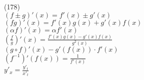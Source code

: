 (178)\\
$(f \pm g)'(x) = f'(x) \pm g'(x)$\\
$(fg)'(x) = f'(x)g(x) + g'(x)f(x)$\\
$(\alpha f)'(x) = \alpha f'(x)$\\
$(\frac{f}{g})'(x) = \frac{f'(x)g(x) - g'(x)f(x)}{g^2(x)}$\\
$(g \circ f)'(x) - g'(f(x))\cdot f'(x)$\\
$(f^{-1})'(f(x)) = \frac{1}{f'(x)}$\\
$y'_x = \frac{y'_t}{x'_t}$